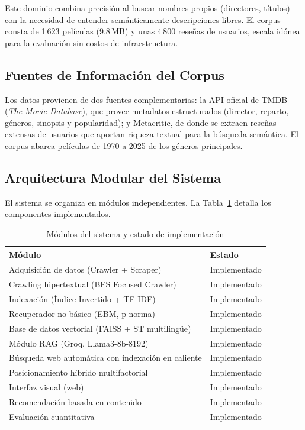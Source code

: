 \documentclass[10pt,a4paper]{llncs}
\begin{document}
Este dominio combina precisión al buscar nombres propios (directores, títulos) con la necesidad de entender semánticamente descripciones libres. El corpus consta de 1\,623 películas (9.8\,MB) y unas 4\,800 reseñas de usuarios, escala idónea para la evaluación sin costos de infraestructura.

\subsection{Fuentes de Información del Corpus}

Los datos provienen de dos fuentes complementarias: la API oficial de TMDB (\textit{The Movie Database}), que provee metadatos estructurados (director, reparto, géneros, sinopsis y popularidad); y Metacritic, de donde se extraen reseñas extensas de usuarios que aportan riqueza textual para la búsqueda semántica. El corpus abarca películas de 1970 a 2025 de los géneros principales.

\subsection{Arquitectura Modular del Sistema}

El sistema se organiza en módulos independientes. La Tabla~\ref{tab:modulos} detalla los componentes implementados.

\begin{table}[htbp]
\caption{Módulos del sistema y estado de implementación}
\centering
\small
\begin{tabular}{@{}ll@{}}
\toprule
\textbf{Módulo} & \textbf{Estado} \\
\midrule
Adquisición de datos (Crawler + Scraper) & Implementado \\
Crawling hipertextual (BFS Focused Crawler) & Implementado \\
Indexación (Índice Invertido + TF-IDF) & Implementado \\
Recuperador no básico (EBM, p-norma) & Implementado \\
Base de datos vectorial (FAISS + ST multilingüe) & Implementado \\
Módulo RAG (Groq, Llama3-8b-8192) & Implementado \\
Búsqueda web automática con indexación en caliente & Implementado \\
Posicionamiento híbrido multifactorial & Implementado \\
Interfaz visual (web) & Implementado \\
Recomendación basada en contenido & Implementado \\
Evaluación cuantitativa & Implementado \\
\bottomrule
\end{tabular}
\label{tab:modulos}
\end{table}
\end{document}

